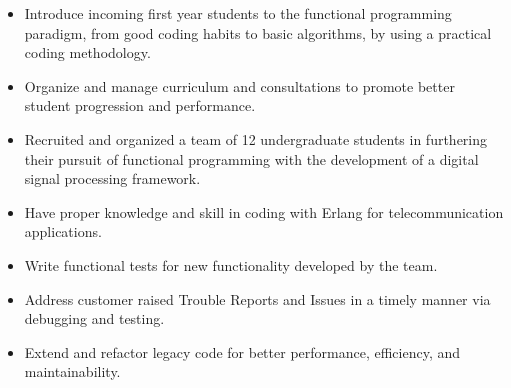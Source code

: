 \documentclass[10pt,a4paper]{altacv}
\begin{document}

\begin{fullwidth}
\makecvheader
\end{fullwidth}




\small{
\begin{itemize}
\item Introduce incoming first year students to the functional programming paradigm, from good coding habits to basic algorithms, by using a practical coding methodology.
\item Organize and manage curriculum and consultations to promote better student progression and performance.
\item Recruited and organized a team of 12 undergraduate students in furthering their pursuit of functional programming with the development of a digital signal processing framework.  
\end{itemize}
}
\divider

\small{
\begin{itemize}
\item Have proper knowledge and skill in coding with Erlang for telecommunication applications.

\item Write functional tests for new functionality developed by the team.

\item Address customer raised Trouble Reports and Issues in a timely manner via debugging and testing.

\item Extend and refactor legacy code for better performance, efficiency, and maintainability.

\end{itemize}
}
\end{document}
